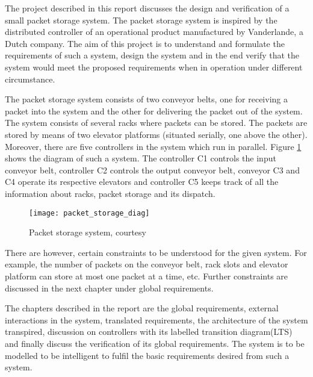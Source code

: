 
The project described in this report discusses the design and verification of a small packet storage system. The packet storage system is inspired by the distributed controller of an operational product manufactured by Vanderlande, a Dutch company. 
The aim of this project is to understand and formulate the requirements of such a system, design the system and in the end verify that the system would meet the proposed requirements when in operation under different circumstance.

The packet storage system consists of two conveyor belts, one for receiving a packet into the system and the other for delivering the packet out of the system. The system consists of several racks where packets can be stored. The packets are stored by means of two elevator platforms (situated serially, one above the other). Moreover, there are five controllers in the system which run in parallel. Figure \ref{fig:packet_storage} shows the diagram of such a system. The controller C1 controls the input conveyor belt, controller C2 controls the output conveyor belt, conveyor C3 and C4 operate its respective elevators and controller C5 keeps track of all the information about racks, packet storage and its dispatch.

\begin{figure}[h]
\center
\texttt{[image: packet\_storage\_diag]}
\caption{Packet storage system, courtesy \cite{problem_statement}}
\label{fig:packet_storage}
\end{figure}

There are however, certain constraints to be understood for the given system. For example, the number of packets on the conveyor belt, rack slots and elevator platform can store at most one packet at a time, etc. Further constraints are discussed in the next chapter under global requirements.

The chapters described in the report are the global requirements, external interactions in the system, translated requirements, the architecture of the system transpired, discussion on controllers with its labelled transition diagram(LTS) and finally discuss the verification of its global requirements.
The system is to be modelled to be intelligent to fulfil the basic requirements desired from such a system.